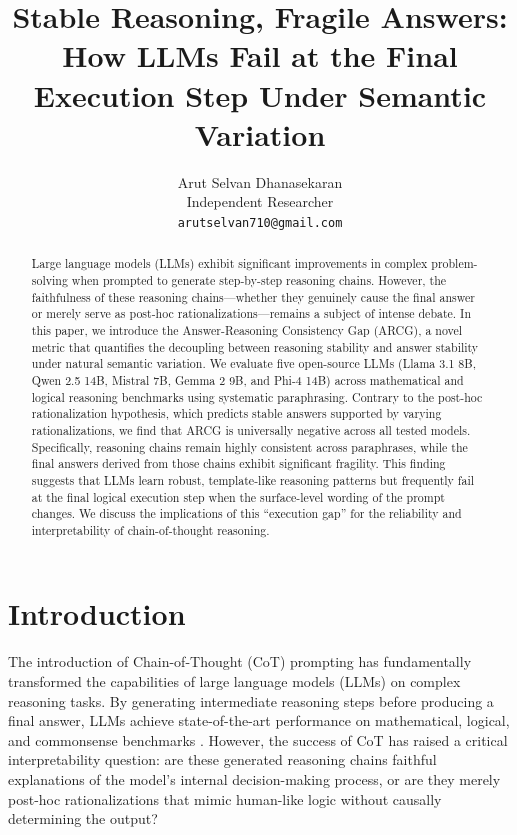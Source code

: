 \documentclass{article} %
\title{Stable Reasoning, Fragile Answers: How LLMs Fail at the Final Execution Step Under Semantic Variation}
\author{Arut Selvan Dhanasekaran \\
Independent Researcher \\
\texttt{arutselvan710@gmail.com}
}
\begin{document}
\maketitle

\begin{abstract}
Large language models (LLMs) exhibit significant improvements in complex problem-solving when prompted to generate step-by-step reasoning chains. However, the faithfulness of these reasoning chains---whether they genuinely cause the final answer or merely serve as post-hoc rationalizations---remains a subject of intense debate. In this paper, we introduce the Answer-Reasoning Consistency Gap (ARCG), a novel metric that quantifies the decoupling between reasoning stability and answer stability under natural semantic variation. We evaluate five open-source LLMs (Llama 3.1 8B, Qwen 2.5 14B, Mistral 7B, Gemma 2 9B, and Phi-4 14B) across mathematical and logical reasoning benchmarks using systematic paraphrasing. Contrary to the post-hoc rationalization hypothesis, which predicts stable answers supported by varying rationalizations, we find that ARCG is universally negative across all tested models. Specifically, reasoning chains remain highly consistent across paraphrases, while the final answers derived from those chains exhibit significant fragility. This finding suggests that LLMs learn robust, template-like reasoning patterns but frequently fail at the final logical execution step when the surface-level wording of the prompt changes. We discuss the implications of this ``execution gap'' for the reliability and interpretability of chain-of-thought reasoning.
\end{abstract}

\section{Introduction}

The introduction of Chain-of-Thought (CoT) prompting \citep{wei2023chainofthoughtpromptingelicitsreasoning, kojima2023largelanguagemodelszeroshot} has fundamentally transformed the capabilities of large language models (LLMs) on complex reasoning tasks. By generating intermediate reasoning steps before producing a final answer, LLMs achieve state-of-the-art performance on mathematical, logical, and commonsense benchmarks \citep{cobbe2021training, hendrycks2021measuring}. However, the success of CoT has raised a critical interpretability question: are these generated reasoning chains faithful explanations of the model's internal decision-making process, or are they merely post-hoc rationalizations that mimic human-like logic without causally determining the output?
\end{document}
